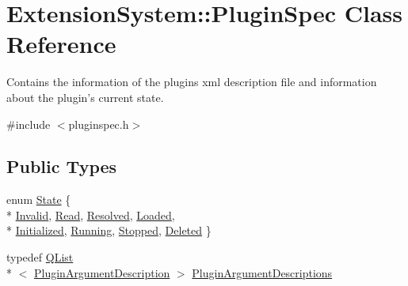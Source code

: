 \hypertarget{class_extension_system_1_1_plugin_spec}{\section{Extension\-System\-:\-:Plugin\-Spec Class Reference}
\label{class_extension_system_1_1_plugin_spec}
}


Contains the information of the plugins xml description file and information about the plugin's current state.  




{\ttfamily \#include $<$pluginspec.\-h$>$}

\subsection*{Public Types}
\begin{DoxyCompactItemize}
\item 
enum \hyperlink{class_extension_system_1_1_plugin_spec_a3d40e1bd1f17eb32b314bcd282b3e3b9}{State} \{ \\*
\hyperlink{class_extension_system_1_1_plugin_spec_a3d40e1bd1f17eb32b314bcd282b3e3b9af4fcbc4b0803e9e7b253ac404c65902c}{Invalid}, 
\hyperlink{class_extension_system_1_1_plugin_spec_a3d40e1bd1f17eb32b314bcd282b3e3b9af535b59005757ad8251db519a5f4a7e7}{Read}, 
\hyperlink{class_extension_system_1_1_plugin_spec_a3d40e1bd1f17eb32b314bcd282b3e3b9abf1eaab858db15373d08dc8cabbd7cec}{Resolved}, 
\hyperlink{class_extension_system_1_1_plugin_spec_a3d40e1bd1f17eb32b314bcd282b3e3b9ae0f34b9f96c75571b3d749b4c6d6e9ff}{Loaded}, 
\\*
\hyperlink{class_extension_system_1_1_plugin_spec_a3d40e1bd1f17eb32b314bcd282b3e3b9a2695d0fa8246182dcfa36d148ba0706d}{Initialized}, 
\hyperlink{class_extension_system_1_1_plugin_spec_a3d40e1bd1f17eb32b314bcd282b3e3b9a7f0dc635a9c4606801a7e8382001e20f}{Running}, 
\hyperlink{class_extension_system_1_1_plugin_spec_a3d40e1bd1f17eb32b314bcd282b3e3b9af7d75f1e9edfb5ddf4c01aebc7708abf}{Stopped}, 
\hyperlink{class_extension_system_1_1_plugin_spec_a3d40e1bd1f17eb32b314bcd282b3e3b9a30ba387e682bf28d58da8c48829bb029}{Deleted}
 \}
\item 
typedef \hyperlink{class_q_list}{Q\-List}\\*
$<$ \hyperlink{struct_extension_system_1_1_plugin_argument_description}{Plugin\-Argument\-Description} $>$ \hyperlink{class_extension_system_1_1_plugin_spec_acf81cc5fcc20b047203f9da886cbbdee}{Plugin\-Argument\-Descriptions}
\end{DoxyCompactItemize}
